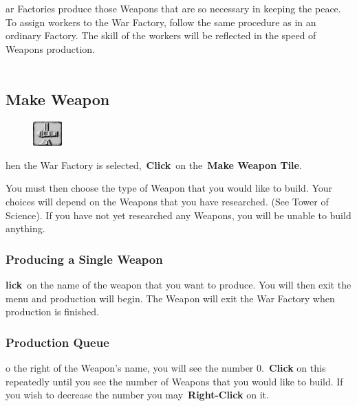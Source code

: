 ar Factories produce those Weapons that are so necessary in keeping the peace. To assign workers to the War Factory, follow the same procedure as in an ordinary Factory. The skill of the workers will be reflected in the speed of Weapons production. \\ \\

\subsection{Make Weapon}


\begin{figure}
	\vspace{-20pt}
	\begin{center}
		\includegraphics[width=0.1\textwidth]{Tweaponmake}
	\end{center}
	\vspace{-20pt}
\end{figure}

hen the War Factory is selected, \textbf{Click} on the \textbf{Make Weapon Tile}.

You must then choose the type of Weapon that you would like to build. Your choices will depend on the Weapons that you have researched. (See Tower of Science). If you have not yet researched any Weapons, you will be unable to build anything.

\subsubsection{Producing a Single Weapon}

\textbf{lick} on the name of the weapon that you want to produce. You will then exit the menu and production will begin. The Weapon will exit the War Factory when production is finished.

\subsubsection{Production Queue}

o the right of the Weapon’s name, you will see the number 0. \textbf{Click} on this repeatedly until you see the number of Weapons that you would like to build. If you wish to decrease the number you may \textbf{Right-Click} on it.

